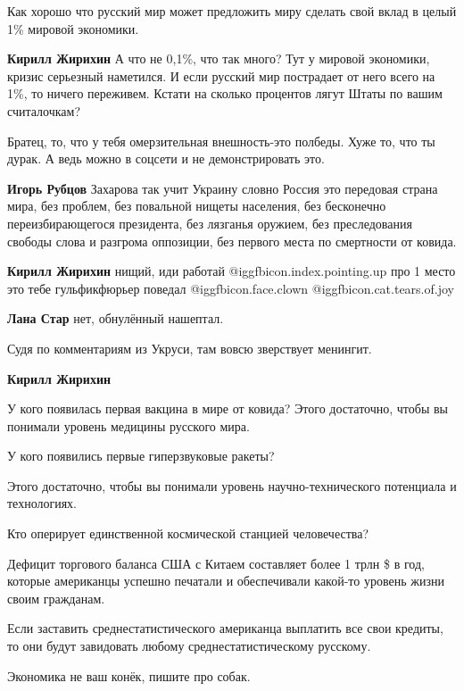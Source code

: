 \begin{itemize}

Как хорошо что русский мир может предложить миру сделать свой вклад в целый 1\%
мировой экономики.

\begin{itemize} %
\textbf{Кирилл Жирихин}
А что не 0,1\%, что так много?
Тут у мировой экономики, кризис серьезный наметился. И если русский мир пострадает от него всего на 1\%, то ничего переживем.
Кстати на сколько процентов лягут Штаты по вашим считалочкам?

Братец, то, что у тебя омерзительная внешность-это полбеды. Хуже то, что ты дурак. А ведь можно в соцсети и не демонстрировать это.

\textbf{Игорь Рубцов} Захарова так учит Украину словно Россия это передовая страна мира, без проблем, без повальной нищеты населения, без бесконечно переизбирающегося президента, без лязганья оружием, без преследования свободы слова и разгрома оппозиции, без первого места по смертности от ковида.

\textbf{Кирилл Жирихин} нищий, иди работай @igg{fbicon.index.pointing.up} про 1 место это тебе гульфикфюрьер поведал  @igg{fbicon.face.clown}  @igg{fbicon.cat.tears.of.joy} 

\textbf{Лана Стар} нет, обнулённый нашептал.

Судя по комментариям из Укруси, там вовсю зверствует менингит.

\textbf{Кирилл Жирихин}

У кого появилась первая вакцина в мире от ковида? Этого достаточно, чтобы вы понимали уровень медицины русского мира.

У кого появились первые гиперзвуковые ракеты?

Этого достаточно, чтобы вы понимали уровень научно-технического потенциала и технологиях.

Кто оперирует единственной космической станцией человечества?

Дефицит торгового баланса США с Китаем составляет более 1 трлн \$ в год, которые
американцы успешно печатали и обеспечивали какой-то уровень жизни своим
гражданам.

Если заставить среднестатистического американца выплатить все свои кредиты, то
они будут завидовать любому среднестатистическому русскому.

Экономика не ваш конёк, пишите про собак.


\end{itemize}
\end{itemize}
